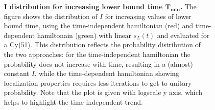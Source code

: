 \begin{figure}[ht]
  \centering
  \caption[$I$ distribution for increasing lower bound time.]{\textbf{$\bm{I}$ distribution for increasing lower bound time $\bm{T_{\min}}$. }The figure shows the distribution of $I$ for increasing values of lower bound time, using the time-independent hamiltonian (red) and time-dependent hamiltonain (green) with linear $s_L(t)$ and evaluated for a Cy(51). This distribution reflects the probability distribution of the two approaches: for the time-independent hamiltonian the probability does not increase with time, resulting in a (almost) constant $I$, while the time-dependent hamiltonian showing localization properties requires less iterations to get to unitary probability. Note that the plot is given with logscale y axis, which helps to highlight the time-independent trend. }
  \label{fig:iters_increasing_time}
\end{figure}
